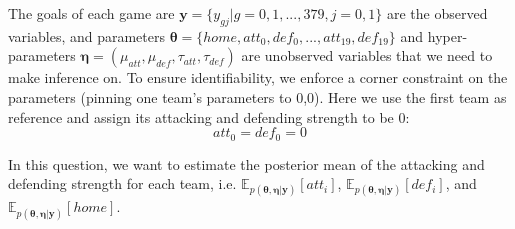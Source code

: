 \documentclass[12pt,letterpaper, onecolumn]{exam}
\begin{document}
\begin{questions}
The goals of each game are $\mathbf{y} = \{ y_{gj} | g=0,1,...,379, j=0,1 \}$ are the observed variables, and parameters $\boldsymbol{\theta} = \{ home, att_0, def_0, ..., att_{19}, def_{19} \}$ and hyper-parameters $\boldsymbol{\eta} = (\mu_{att}, \mu_{def}, \tau_{att}, \tau_{def})$ are unobserved variables that we need to make inference on. To ensure identifiability, we enforce a corner constraint on the parameters (pinning one team’s parameters to 0,0). Here we use the first team as reference and assign its attacking and defending strength to be 0:
\begin{equation}
att_0 = def_0 = 0
\end{equation}

In this question, we want to estimate the posterior mean of the attacking and defending strength for each team, i.e. $\mathbb{E}_{p(\boldsymbol{\theta},\boldsymbol{\eta}|\mathbf{y})} [att_i]$, $\mathbb{E}_{p(\boldsymbol{\theta},\boldsymbol{\eta}|\mathbf{y})} [def_i]$, and $\mathbb{E}_{p(\boldsymbol{\theta},\boldsymbol{\eta}|\mathbf{y})} [home]$.

\end{questions}
\end{document}
